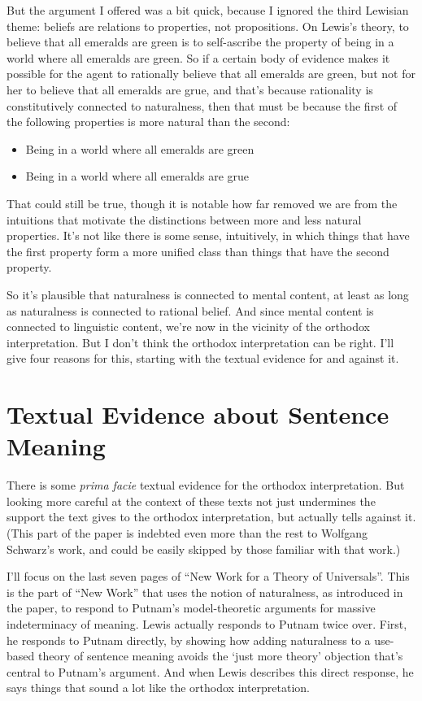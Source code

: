 \documentclass[
  11pt,
  letterpaper,
  DIV=11,
  numbers=noendperiod,
  twoside]{scrartcl}
\providecommand{\tightlist}{%
  \setlength{\itemsep}{0pt}\setlength{\parskip}{0pt}}
\begin{document}
But the argument I offered was a bit quick, because I ignored the third
Lewisian theme: beliefs are relations to properties, not propositions.
On Lewis's theory, to believe that all emeralds are green is to
self-ascribe the property of being in a world where all emeralds are
green. So if a certain body of evidence makes it possible for the agent
to rationally believe that all emeralds are green, but not for her to
believe that all emeralds are grue, and that's because rationality is
constitutively connected to naturalness, then that must be because the
first of the following properties is more natural than the second:

\begin{itemize}
\tightlist
\item
  Being in a world where all emeralds are green
\item
  Being in a world where all emeralds are grue
\end{itemize}

That could still be true, though it is notable how far removed we are
from the intuitions that motivate the distinctions between more and less
natural properties. It's not like there is some sense, intuitively, in
which things that have the first property form a more unified class than
things that have the second property.

So it's plausible that naturalness is connected to mental content, at
least as long as naturalness is connected to rational belief. And since
mental content is connected to linguistic content, we're now in the
vicinity of the orthodox interpretation. But I don't think the orthodox
interpretation can be right. I'll give four reasons for this, starting
with the textual evidence for and against it.

\section{Textual Evidence about Sentence
Meaning}\label{textual-evidence-about-sentence-meaning}

There is some \emph{prima facie} textual evidence for the orthodox
interpretation. But looking more careful at the context of these texts
not just undermines the support the text gives to the orthodox
interpretation, but actually tells against it. (This part of the paper
is indebted even more than the rest to Wolfgang Schwarz's work, and
could be easily skipped by those familiar with that work.)

I'll focus on the last seven pages of ``New Work for a Theory of
Universals''. This is the part of ``New Work'' that uses the notion of
naturalness, as introduced in the paper, to respond to Putnam's
model-theoretic arguments for massive indeterminacy of meaning. Lewis
actually responds to Putnam twice over. First, he responds to Putnam
directly, by showing how adding naturalness to a use-based theory of
sentence meaning avoids the `just more theory' objection that's central
to Putnam's argument. And when Lewis describes this direct response, he
says things that sound a lot like the orthodox interpretation.
\end{document}
